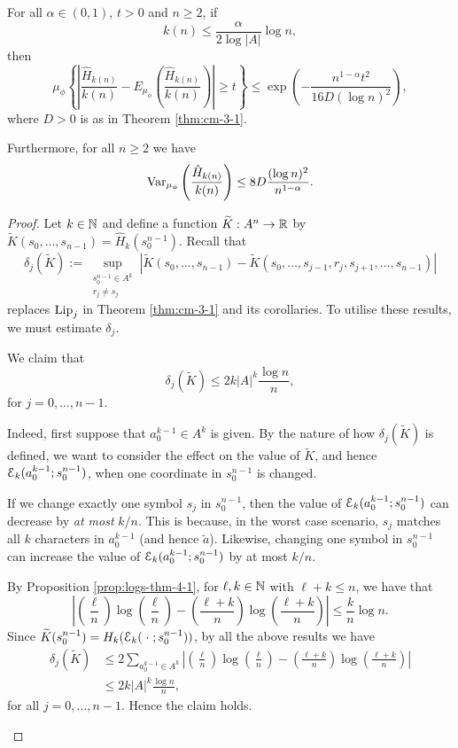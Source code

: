 \begin{theorem}\label{thm:cm-4-1}
	For all $\alpha \in (0, 1)$, $t > 0$ and $n \geq 2$, if
	\[
		k(n) \leq \frac{\alpha}{2 \log{|A|}}\log{n},
	\]
	then
	\[
		\mu_\phi\left\{\left|\frac{\hat{H}_{k(n)}}{k(n)} - E_{\mu_\phi}\left(\frac{\hat{H}_{k(n)}}{k(n)}\right)\right| \geq t\right\} \leq \exp\left(-\frac{n^{1 - \alpha} t^2}{16D(\log{n})^2}\right),
	\]
	where $D > 0$ is as in Theorem \ref{thm:cm-3-1}.
	
	Furthermore, for all $n \geq 2$ we have
	\[
		\operatorname{Var}_{\mu_\phi}\left(\frac{\hat{H}_{k(n)}}{k(n)}\right) \leq 8D\frac{(\log{n})^2}{n^{1 - \alpha}}.
	\]
	\begin{proof}
		Let $k \in \mathbb{N}$ and define a function $\widetilde{K} : A^n \to \mathbb{R}$ by $\tilde{K}(s_0, \dots, s_{n - 1}) = \hat{H}_k(s_0^{n - 1})$. Recall that
		\[
			\delta_j(\tilde{K}) := \sup_{\substack{s_0^{n - 1} \in A^k \\ r_j \neq s_j}}{|\tilde{K}(s_0, \dots, s_{n - 1}) - \tilde{K}(s_0, \dots, s_{j - 1}, r_j, s_{j + 1}, \dots, s_{n - 1})|}
		\]
		replaces $\operatorname{Lip}_j$ in Theorem \ref{thm:cm-3-1} and its corollaries. To utilise these results, we must estimate $\delta_j$.
		\begin{claim}
			We claim that
			\begin{equation}
				\delta_j(\tilde{K}) \leq 2k|A|^k\frac{\log{n}}{n}, \label{fml:oscil-est}
			\end{equation}
			for $j = 0, \dots, n - 1$.
			
			Indeed, first suppose that $a_0^{k - 1} \in A^k$ is given. By the nature of how $\delta_j(\tilde{K})$ is defined, we want to consider the effect on the value of $\tilde{K}$, and hence $\mathcal{E}_k(a_0^{k - 1};s_0^{n - 1})$, when one coordinate in $s_0^{n - 1}$ is changed.
			
			If we change exactly one symbol $s_j$ in $s_0^{n - 1}$, then the value of $\mathcal{E}_k(a_0^{k - 1}; s_0^{n - 1})$ can decrease by \emph{at most} $k / n$. This is because, in the worst case scenario, $s_j$ matches all $k$ characters in $a_0^{k - 1}$ (and hence $\tilde{a}$). Likewise, changing one symbol in $s_0^{n - 1}$ can increase the value of $\mathcal{E}_k(a_0^{k - 1}; s_0^{n - 1})$ by at most $k / n$.
			
			By Proposition \ref{prop:logs-thm-4-1}, for $\ell, k \in \mathbb{N}$ with $\ell+ k \leq n$, we have that
			\[
				\left|\left(\frac{\ell}{n}\right)\log\left(\frac{\ell}{n}\right) - \left(\frac{\ell + k}{n}\right)\log\left(\frac{\ell + k}{n}\right)\right| \leq \frac{k}{n}\log{n}.
			\]
			Since $\widetilde{K}(s_0^{n - 1}) = H_k(\mathcal{E}_k(\mathrel{}\cdot\mathrel{}; s_0^{n - 1}))$, by all the above results we have
			\begin{align*}
				\delta_j(\tilde{K}) &\leq 2\sum_{a_0^{k - 1} \in A^k}{\left|\left(\frac{\ell}{n}\right)\log\left(\frac{\ell}{n}\right) - \left(\frac{\ell + k}{n}\right)\log\left(\frac{\ell + k}{n}\right)\right|} \\
				 &\leq 2k|A|^k \frac{\log{n}}{n},
			\end{align*}
			for all $j = 0, \dots, n - 1$. Hence the claim holds.
		\end{claim}
		

\end{proof}
\end{theorem}
